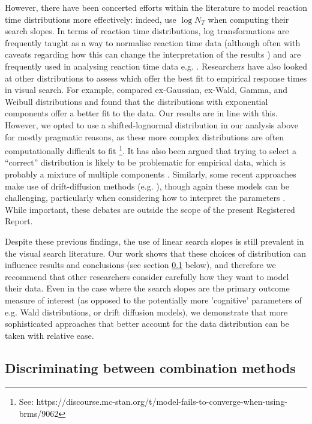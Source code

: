 \documentclass[preprint,12pt,authoryear]{elsarticle}
\begin{document}
However, there have been concerted efforts within the literature to model reaction time distributions more effectively: indeed, \cite{buetti2019predicting} use $\log{N_T}$ when computing their search slopes. In terms of reaction time distributions, log transformations are frequently taught as a way to normalise reaction time data (although often with caveats regarding how this can change the interpretation of the results \citep{osborne2002notes}) and are frequently used in analysing reaction time data e.g. \citep{clarke2022visual}. Researchers have also looked at other distributions to assess which offer the best fit to empirical response times in visual search. For example, \cite{palmer2011shapes} compared ex-Gaussian, ex-Wald, Gamma, and Weibull distributions and found that the distributions with exponential components offer a better fit to the data. Our results are in line with this. However, we opted to use a shifted-lognormal distribution in our analysis above for mostly pragmatic reasons, as these more complex distributions are often computationally difficult to fit \footnote {See: https://discourse.mc-stan.org/t/model-fails-to-converge-when-using-brms/9062}. It has also been argued that trying to select a ``correct'' distribution is likely to be problematic for empirical data, which is probably a mixture of multiple components \citep{wolfe2010reaction}. Similarly, some recent approaches make use of drift-diffusion methods (e.g. \cite{wolfe2010varying, yu2022attentional, corbett2020diffusion}), though again these models can be challenging, particularly when considering how to interpret the parameters \citep{evans2019evidence, bompas2023non}. While important, these debates are outside the scope of the present Registered Report. 

Despite these previous findings, the use of linear search slopes is still prevalent in the visual search literature. Our work shows that these choices of distribution can influence results and conclusions (see section \ref{sec:dis_combmethods} below), and therefore we recommend that other researchers consider carefully how they want to model their data. Even in the case where the search slopes are the primary outcome measure of interest (as opposed to the potentially more 'cognitive' parameters of e.g. Wald distributions, or drift diffusion models), we demonstrate that more sophisticated approaches that better account for the data distribution can be taken with relative ease.


\subsection{Discriminating between combination methods}
\label{sec:dis_combmethods}
\end{document}
